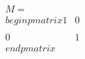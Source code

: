 \documentclass[preview]{standalone}
\begin{document}
\begin{align*}
M = \\begin{pmatrix} 1 & 0 \\\\ 0 & 1 \\end{pmatrix}
\end{align*}
\end{document}

